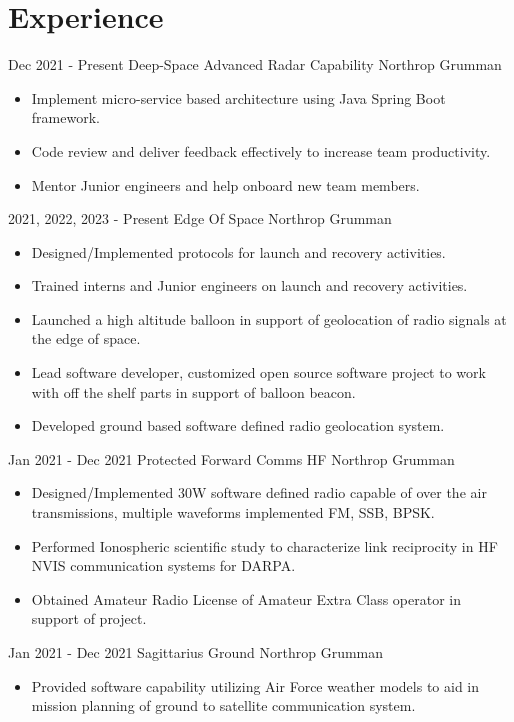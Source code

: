 \documentclass[]{src/friggeri-cv}
\begin{document}
\section{Experience}
\begin{entrylist}
  \entry
    {Dec 2021 - Present}
    {Deep-Space Advanced Radar Capability}
    {Northrop Grumman}
    {\begin{itemize}
        \item Implement micro-service based architecture using Java Spring Boot framework.
        \item Code review and deliver feedback effectively to increase team productivity.
        \item Mentor Junior engineers and help onboard new team members.
    \end{itemize}}
  \entry
    {2021, 2022, 2023 - Present}
    {Edge Of Space}
    {Northrop Grumman}
    {\begin{itemize}
        \item Designed/Implemented protocols for launch and recovery activities.
        \item Trained interns and Junior engineers on launch and recovery activities.
        \item Launched a high altitude balloon in support of geolocation of radio signals at the edge of space.
        \item Lead software developer, customized open source software project to work with off the shelf parts in support of balloon beacon.
        \item Developed ground based software defined radio geolocation system.
    \end{itemize}}
  \entry
    {Jan 2021 - Dec 2021}
    {Protected Forward Comms HF}
    {Northrop Grumman}
    {\begin{itemize}
        \item Designed/Implemented 30W software defined radio capable of over the air transmissions, multiple waveforms implemented FM, SSB, BPSK.
        \item Performed Ionospheric scientific study to characterize link reciprocity in HF NVIS communication systems for DARPA.
        \item Obtained Amateur Radio License of Amateur Extra Class operator in support of project.
    \end{itemize}}
  \entry
    {Jan 2021 - Dec 2021}
    {Sagittarius Ground}
    {Northrop Grumman}
    {\begin{itemize}
        \item Provided software capability utilizing Air Force weather models to aid in mission planning of ground to satellite communication system.

\end{itemize}}
\end{entrylist}
\end{document}
